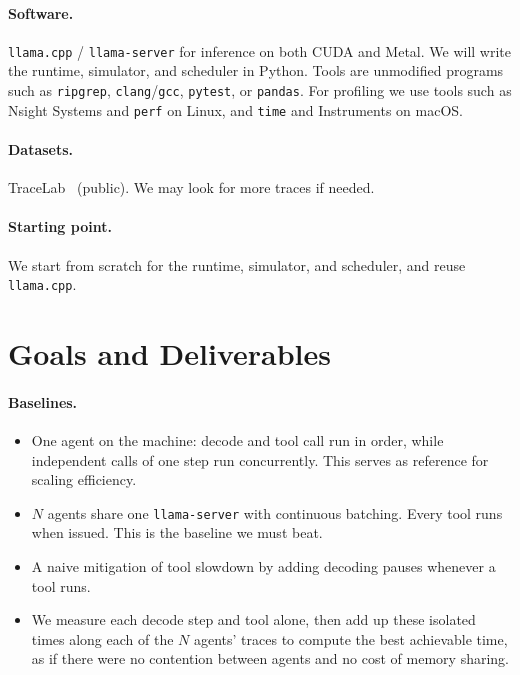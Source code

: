\documentclass[11pt]{article}
\newcommand{\code}[1]{\texttt{#1}}
\begin{document}
\paragraph{Software.}
\code{llama.cpp} / \code{llama-server} for inference on both CUDA and Metal. We will write the runtime, simulator, and scheduler in Python. Tools are unmodified programs such as \code{ripgrep}, \code{clang}/\code{gcc}, \code{pytest}, or \code{pandas}. 
For profiling we use tools such as Nsight Systems and \code{perf} on Linux, and \code{time} and Instruments on macOS.

\paragraph{Datasets.}
TraceLab~\cite{tracelab} (public). We may look for more traces if needed.

\paragraph{Starting point.}
We start from scratch for the runtime, simulator, and scheduler, and reuse \code{llama.cpp}.

\section*{Goals and Deliverables}
 
\paragraph{Baselines.}
\begin{itemize}[leftmargin=4.5em]
  \item[\textbf{Solo}] One agent on the machine: decode and tool call run in order, while independent calls of one step run concurrently. This serves as reference for scaling efficiency.
  \item[\textbf{Naive}] $N$ agents share one \code{llama-server} with
    continuous batching. Every tool runs when issued. This is the baseline we must beat.
  \item[\textbf{Stagger}] A naive mitigation of tool slowdown by adding decoding pauses whenever a tool runs.
  \item[\textbf{Ideal}] We measure each decode step and tool alone, then add up these isolated times along each of the $N$ agents' traces to compute the best achievable time, as if there were no contention between agents and no cost of memory sharing. 
\end{itemize}
\end{document}
